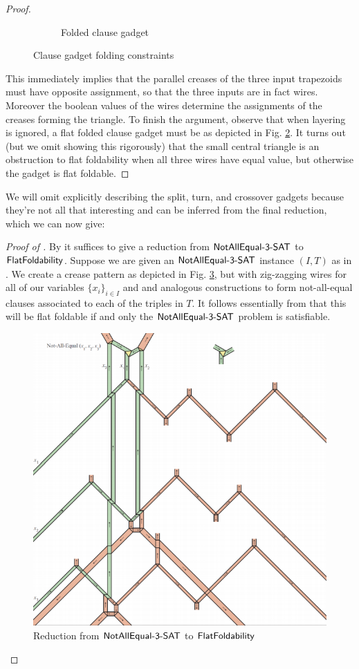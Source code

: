 \begin{proof}
\begin{figure}[h!tbp]
\begin{subfigure}{.35\textwidth}
      \caption{Folded clause gadget}
      \label{clause-folded}
    \end{subfigure}
    \caption{Clause gadget folding constraints
      \cite{demaine-GFALOP-lecture}}
  \end{figure}
  This immediately implies that the parallel creases of the three
  input trapezoids must have opposite assignment, so that the three
  inputs are in fact wires. Moreover the boolean values of the wires
  determine the assignments of the creases forming the triangle. To
  finish the argument, observe that when layering is ignored, a flat
  folded clause gadget must be as depicted in Fig.
  \ref{clause-folded}. It turns out (but we omit showing this
  rigorously) that the small central triangle is an obstruction to
  flat foldability when all three wires have equal value, but
  otherwise the gadget is flat foldable.
\end{proof}

We will omit explicitly describing the split, turn, and crossover
gadgets because they're not all that interesting and can be inferred
from the final reduction, which we can now give:

\begin{proof}[Proof of ]
  By  it suffices to give a reduction from $\mathsf{NotAllEqual\text{-} 3\text{-} SAT}$ to
  $\mathsf{FlatFoldability}$. Suppose we are given an $\mathsf{NotAllEqual\text{-} 3\text{-} SAT}$ instance $(I,T)$
  as in . We create a crease pattern as depicted in
  Fig. \ref{flatreduction}, but with zig-zagging wires for all of our
  variables $\{x_i\}_{i \in I}$ and and analogous constructions to
  form not-all-equal clauses associated to each of the triples in
  $T$. It follows essentially from  that this will be
  flat foldable if and only the $\mathsf{NotAllEqual\text{-} 3\text{-} SAT}$ problem is satisfiable.
  \begin{figure}[h!tbp]
    \includegraphics[width=.8\textwidth]{origami-data/flat-reduction}
    \caption{Reduction from $\mathsf{NotAllEqual\text{-} 3\text{-} SAT}$ to $\mathsf{FlatFoldability}$
      \cite{demaine-GFALOP-lecture}}
    \label{flatreduction}
  \end{figure}
\end{proof}

